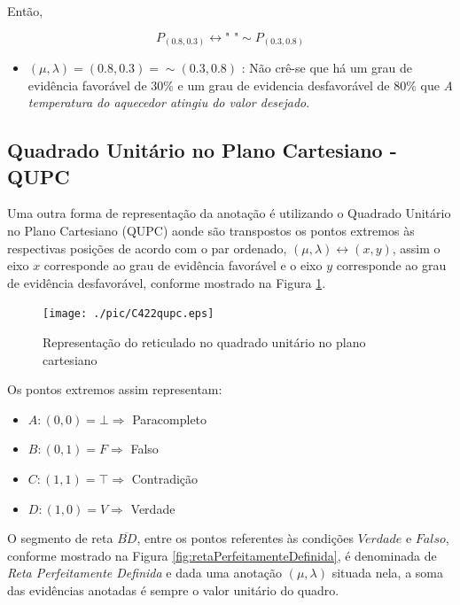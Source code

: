 Então,
\begin{center}
\begin{equation}
P_{(0.8,0.3)} \leftrightarrow \textrm{"   "} \sim P_{(0.3,0.8)}
\end{equation}
\end{center}

\begin{itemize}
\item 
$(\mu, \lambda ) = (0.8,0.3) = \sim (0.3,0.8)$ : Não crê-se que há um grau de evidência favorável de 30\% e um grau de evidencia desfavorável de 80\% que \emph{A temperatura do aquecedor atingiu do valor desejado}.
\end{itemize}



\subsection{Quadrado Unitário no Plano Cartesiano - QUPC}

Uma outra forma de representação da anotação é utilizando o Quadrado Unitário no Plano Cartesiano (QUPC) aonde são transpostos os pontos extremos às respectivas posições de acordo com o par ordenado,  $(\mu, \lambda ) \leftrightarrow (x,y) $, assim o eixo $x$ corresponde ao grau de evidência favorável e o eixo $y$ corresponde ao grau de evidência desfavorável, conforme mostrado na Figura \ref{fig:reticuladoQUPC}.



\begin{figure}[!htb]
\center\texttt{[image: ./pic/C422qupc.eps]}
\caption{Representação do reticulado no quadrado unitário no plano cartesiano}
\label{fig:reticuladoQUPC}
\end{figure}

Os pontos extremos assim representam:

\begin{itemize}
\item $A: (0,0) = \bot \Rightarrow $ Paracompleto
\item $B: (0,1) = F \Rightarrow $ Falso
\item $C: (1,1) = \top \Rightarrow $ Contradição
\item $D: (1,0) = V \Rightarrow $ Verdade
\end{itemize}

O segmento de reta $\overline{BD}$, entre os pontos referentes às condições $Verdade$ e $Falso$, conforme mostrado na Figura \ref{fig:retaPerfeitamenteDefinida}, é denominada de \emph{Reta Perfeitamente Definida} e dada uma anotação $(\mu, \lambda )$ situada nela, a soma das evidências anotadas é sempre o valor unitário do quadro. 

